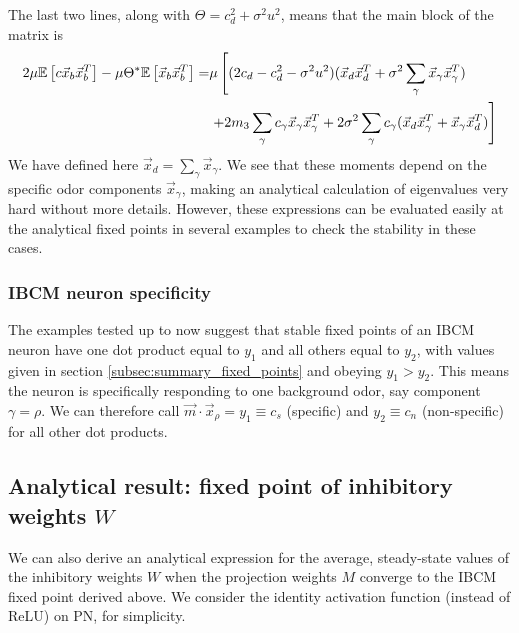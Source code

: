 The last two lines, along with $\Theta = c_d^2 + \sigma^2 u^2$, means that the main block of the matrix is
\begin{align*}
2 \mu \mathbb{E}\left[ c \vec{x}_b \vec{x}_b^T \right] - \mu \Theta^* \mathbb{E}\left[ \vec{x}_b \vec{x}_b^T \right] = & \mu \left[(2 c_d - c_d^2 - \sigma^2 u^2) (\vec{x}_d \vec{x}_d^T + \sigma^2 \sum_{\gamma} \vec{x}_{\gamma} \vec{x}_{\gamma}^T)	\right.\\
 	&\left. + 2 m_3 \sum_{\gamma} c_{\gamma} \vec{x}_{\gamma} \vec{x}_{\gamma}^T + 2\sigma^2 \sum_{\gamma} c_{\gamma} (\vec{x}_d \vec{x}_{\gamma}^T + \vec{x}_{\gamma} \vec{x}_d^T) \right]
\end{align*}
We have defined here $\vec{x}_d = \sum_{\gamma} \vec{x}_{\gamma}$. We see that these moments depend on the specific odor components $\vec{x}_{\gamma}$, making an analytical calculation of eigenvalues very hard without more details. However, these expressions can be evaluated easily at the analytical fixed points in several examples to check the stability in these cases. 

\subsubsection{IBCM neuron specificity}
The examples tested up to now suggest that stable fixed points of an IBCM neuron have one dot product equal to $y_1$ and all others equal to $y_2$, with values given in section \ref{subsec:summary_fixed_points} and obeying $y_1 > y_2$. This means the neuron is specifically responding to one background odor, say component $\gamma=\rho$. We can therefore call $\vec{m} \cdot \vec{x}_{\rho} = y_1 \equiv c_s$ (specific) and $y_2 \equiv c_n$ (non-specific) for all other dot products. 



\subsection{Analytical result: fixed point of inhibitory weights $W$}
\label{subsec:fixed_point_w}
We can also derive an analytical expression for the average, steady-state values of the inhibitory weights $W$ when the projection weights $M$ converge to the IBCM fixed point derived above. We consider the identity activation function (instead of ReLU) on PN, for simplicity. 

